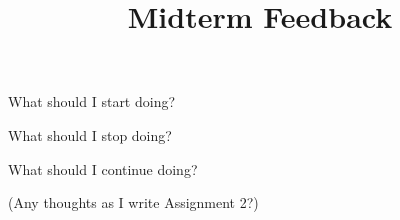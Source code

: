 \documentclass[12pt]{article}
\title{Midterm Feedback}
\date{}
\begin{document}
\maketitle
\thispagestyle{empty}

What should I start doing?
\vspace*{.2\textheight}

What should I stop doing?
\vspace*{.2\textheight}

What should I continue doing?
\vspace*{.2\textheight}

(Any thoughts as I write Assignment 2?)
\end{document}
